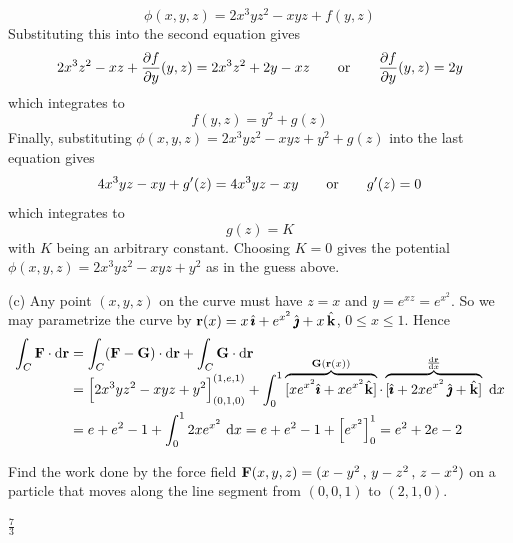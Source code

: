 \begin{solution}
\begin{equation*}
\phi(x,y,z) = 2x^3yz^2-xyz + f(y,z)
\end{equation*}
Substituting this into the second equation gives 
\begin{equation*}
2x^3z^2-xz + \pdiff{f}{y}(y,z) 
   = 2x^3z^2 + 2y - xz \qquad\hbox{or}\qquad 
\pdiff{f}{y}(y,z) = 2y
\end{equation*}
which integrates to
\begin{equation*}
f(y,z) = y^2+ g(z)
\end{equation*}
Finally, substituting $\phi(x,y,z) = 2x^3yz^2-xyz + y^2 + g(z)$
into the last equation gives
\begin{equation*}
4x^3yz-xy + g'(z) = 4x^3yz-xy\qquad\hbox{or}\qquad 
g'(z) = 0
\end{equation*}
which integrates to
\begin{equation*}
g(z) =  K
\end{equation*}
with $K$ being an arbitrary constant.
Choosing $K=0$ gives the potential $\phi(x,y,z) =  2x^3yz^2-xyz + y^2$
as in the guess above.


(c) Any point $(x,y,z)$ on the curve must have $z=x$ and $y=e^{xz}=e^{x^2}$.
So we may parametrize the curve by
$\mathbf{r}(x)=x\,\hat{\pmb{\imath}}+e^{x^2}\,\hat{\pmb{\jmath}}+x\,\hat{\mathbf{k}}$, $0\le x\le 1$. Hence
\begin{align*}
\int_C\vF\cdot \dee{\vr}
&=\int_C(\vF-\vG)\cdot \dee{\vr}+\int_C\vG\cdot \dee{\vr}\\[-0.2in]
&=\Big[2x^3yz^2-xyz+y^2\Big]_{(0,1,0)}^{(1,e,1)}
+\int_0^1\overbrace{[xe^{x^2}\hi + xe^{x^2}\hk]}^{\vG(\vr(x))}\cdot 
   \overbrace{[\hi+2xe^{x^2}\,\hj+\hk]}^{\diff{\vr}{x}}\ \dee{x}\\
&=e+e^2-1+\int_0^1 2xe^{x^2}\ \dee{x}
=e+e^2-1+\Big[e^{x^2}\Big]_0^1
=e^2+2e-2
\end{align*}
\end{solution}

\begin{question}[M317 2016D] %
Find the work done by the force field 
$\mathbf{F}(x,y,z) = (x - y^2\,,\, y - z^2\,,\, z - x^2)$ on a particle 
that moves along the line segment from $(0, 0, 1)$ to $(2, 1, 0)$.
\end{question}

%

\begin{answer} 
$\frac{7}{3}$
\end{answer}

